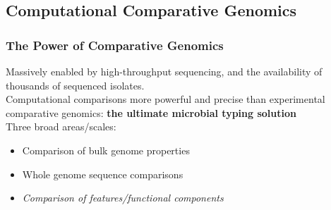 
\subsection{Computational Comparative Genomics}

\begin{frame}
  \frametitle{The Power of Comparative Genomics}
  Massively enabled by high-throughput sequencing, and the availability of thousands of sequenced isolates.\\[0.5cm]
  Computational comparisons more powerful and precise than experimental comparative genomics: \textbf{the ultimate microbial typing solution}\\[0.5cm]
  Three broad areas/scales:
  \begin{itemize}
    \item Comparison of bulk genome properties
    \item Whole genome sequence comparisons
    \item \textit{Comparison of features/functional components}
  \end{itemize}    
\end{frame}

